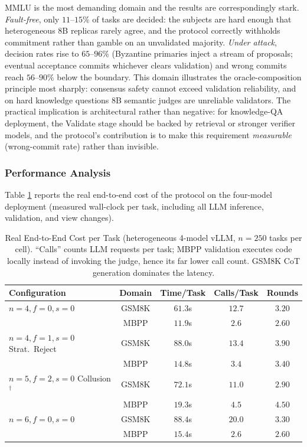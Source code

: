 \documentclass{article}
\begin{document}
MMLU is the most demanding domain and the results are correspondingly stark. \emph{Fault-free}, only $11$--$15\%$ of tasks are decided: the subjects are hard enough that heterogeneous 8B replicas rarely agree, and the protocol correctly withholds commitment rather than gamble on an unvalidated majority. \emph{Under attack}, decision rates rise to $65$--$96\%$ (Byzantine primaries inject a stream of proposals; eventual acceptance commits whichever clears validation) and wrong commits reach $56$--$90\%$ below the boundary. This domain illustrates the oracle-composition principle most sharply: consensus safety cannot exceed validation reliability, and on hard knowledge questions 8B semantic judges are unreliable validators. The practical implication is architectural rather than negative: for knowledge-QA deployment, the Validate stage should be backed by retrieval or stronger verifier models, and the protocol's contribution is to make this requirement \emph{measurable} (wrong-commit rate) rather than invisible.

\subsubsection{Performance Analysis}
Table \ref{tab:performance} reports the real end-to-end cost of the protocol on the four-model deployment (measured wall-clock per task, including all LLM inference, validation, and view changes).

\begin{table}[htbp]
\centering
\caption{Real End-to-End Cost per Task (heterogeneous 4-model vLLM, $n{=}250$ tasks per cell). ``Calls'' counts LLM requests per task; MBPP validation executes code locally instead of invoking the judge, hence its far lower call count. GSM8K CoT generation dominates the latency.}
\label{tab:performance}
\begin{tabular}{lcccc}
\toprule
\textbf{Configuration} & \textbf{Domain} & \textbf{Time/Task} & \textbf{Calls/Task} & \textbf{Rounds} \\
\midrule
$n=4, f=0, s=0$ & GSM8K & $61.3$s & $12.7$ & $3.20$ \\
 & MBPP & $11.9$s & $2.6$ & $2.60$ \\
$n=4, f=1, s=0$ Strat.\ Reject & GSM8K & $88.0$s & $13.4$ & $3.90$ \\
 & MBPP & $14.8$s & $3.4$ & $3.40$ \\
$n=5, f=2, s=0$ Collusion$^\dag$ & GSM8K & $72.1$s & $11.0$ & $2.90$ \\
 & MBPP & $19.3$s & $4.5$ & $4.50$ \\
$n=6, f=0, s=0$ & GSM8K & $88.4$s & $20.0$ & $3.30$ \\
 & MBPP & $15.4$s & $2.6$ & $2.60$ \\
\bottomrule
\end{tabular}
\end{table}
\end{document}
